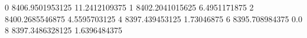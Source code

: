0 8406.9501953125 11.2412109375
1 8402.2041015625 6.4951171875
2 8400.2685546875 4.5595703125
4 8397.439453125 1.73046875
6 8395.708984375 0.0
8 8397.3486328125 1.6396484375
